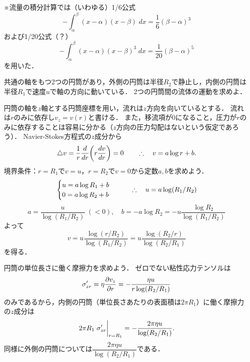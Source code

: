 \begin{kaitou}
\begin{details}
※流量の積分計算では（いわゆる）1/6公式
\[
    -\int_{\alpha}^{\beta} (x-\alpha)(x-\beta)\; dx = \frac{1}{6}(\beta-\alpha)^3
\]
および1/20公式（？）
\[
    -\int_{\alpha}^{\beta} (x-\alpha)(x-\beta)^3\; dx = \frac{1}{20}(\beta-\alpha)^5
\]
を用いた．    
\end{details}



    
\end{kaitou}








\begin{mondai}{}{}
共通の軸をもつ2つの円筒があり，外側の円筒は半径$R_2$で静止し，内側の円筒は半径$R_1$で速度$u$で軸の方向に動いている．
2つの円筒間の流体の運動を求めよ．
\end{mondai}
\begin{kaitou}
円筒の軸を$z$軸とする円筒座標を用い，流れは$z$方向を向いているとする．
流れは$r$のみに依存し$v_z=v(r)$と書ける．
また，移流項が0になること，圧力が$r$のみに依存することは容易に分かる（$z$方向の圧力勾配はないという仮定であろう）．
Navier-Stokes方程式の$z$成分から
\[
    \Laplacian v = \frac{1}{r} \dv{r} \pqty{ r \dv{v}{r} } = 0
    \qquad\yueni v = a \log r + b .
\]
境界条件：$r=R_1$で$v=u$，$r=R_2$で$v=0$から定数$a,b$を求めよう．
\[
    \begin{cases}
        u = a \log R_1 + b \\
        0 = a \log R_2 + b \\
    \end{cases}
    \qquad\therefore\quad u = a \log (R_1/R_2)
\]
\[
    a = \frac{u}{\log(R_1/R_2)} \; (<0), \quad
    b = - a\log R_2 = -u \frac{\log R_2}{\log(R_1/R_2)}
\]
よって
\[
    v = u \frac{\log(r/R_2)}{\log(R_1/R_2)}
    = u \frac{\log(R_2/r)}{\log(R_2/R_1)}
\]
を得る．

円筒の単位長さに働く摩擦力を求めよう．
ゼロでない粘性応力テンソルは
\[
    \sigma_{zr}' = \eta \pdv{v_z}{r} = -\frac{\eta u}{r\log(R_2/R_1)}
\]
のみであるから，内側の円筒（単位長さあたりの表面積は$2\pi R_1$）に働く摩擦力の$z$成分は
\[
    2\pi R_1 \eval{\sigma_{zr}'}_{r=R_1} = -\frac{2\pi\eta u}{\log(R_2/R_1)} .
\]
同様に外側の円筒については$\dfrac{2\pi\eta u}{\log(R_2/R_1)}$である．


    
\end{kaitou}







